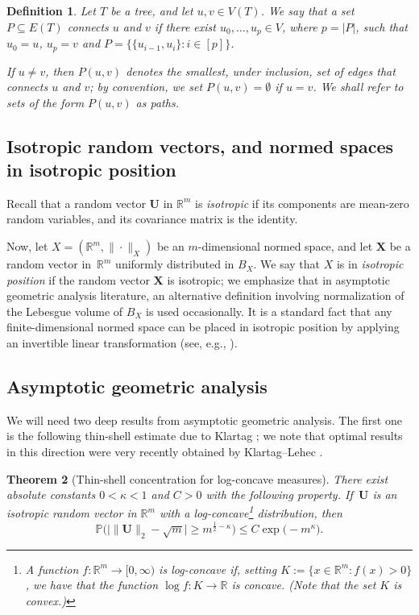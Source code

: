 \documentclass[11pt,leqno]{amsart}
\newtheorem{theorem}{Theorem}[section]
\newtheorem{definition}[theorem]{Definition}
\theoremstyle{remark}
\theoremstyle{plain}
\begin{document}
\begin{definition} \label{def2.1}
Let $T$ be a tree, and let $u,v\in V(T)$. We say that a set $P\subseteq E(T)$ \emph{connects $u$ and $v$} if there exist $u_0,\ldots,u_p\in V$, where $p=|P|$, such that $u_0=u$, $u_p=v$ and $P=\big\{\{u_{i-1},u_i\}\colon i\in[p]\big\}$.

If $u\neq v$, then $P(u,v)$ denotes the smallest, under inclusion, set of edges that connects $u$ and $v$; by convention, we set $P(u,v)=\emptyset$ if $u=v$. We shall refer to sets of the form $P(u,v)$ as \emph{paths}.
\end{definition}

\subsection{Isotropic random vectors, and normed spaces in isotropic position}

Recall that a random vector $\mathbf{U}$ in $\mathbb{R}^m$ is \textit{isotropic} if its components are mean-zero random variables, and its covariance matrix is the identity.

Now, let $X=(\mathbb{R}^m,\|\cdot\|_X)$ be an $m$-dimensional normed space, and let $\mathbf{X}$ be a random vector in~$\mathbb{R}^m$ uniformly distributed in $B_X$. We say that $X$ is in \textit{isotropic position} if the random vector $\mathbf{X}$ is isotropic;
we emphasize that in asymptotic geometric analysis literature, an alternative definition involving normalization of the Lebesgue volume of $B_X$ is used occasionally. It is a standard fact that any finite-dimensional normed space can be placed in isotropic position by applying an invertible linear transformation
(see, e.g., \cite{KL24a}).

\subsection{Asymptotic geometric analysis}

We will need two deep results from asymptotic geometric analysis. The first one is the following thin-shell estimate due to Klartag \cite{Kl07}; we note that optimal results in this direction were very recently obtained by Klartag--Lehec \cite{KL25}.

\begin{theorem}[Thin-shell concentration for log-concave measures] \label{thm:thinshell}
There exist absolute constants $0<\kappa <1$ and $C>0$ with the following property. If\, $\mathbf{U}$ is an isotropic random vector in $\mathbb{R}^m$ with a log-concave\footnote{A function $f\colon \mathbb{R}^m\to [0,\infty)$ is \emph{log-concave} if, setting $K:=\{x\in\mathbb{R}^m\colon f(x) > 0\}$, we have that the function $\log f\colon K\to\mathbb{R}$ is concave. (Note that the set $K$ is convex.)} distribution, then
\begin{equation} \label{eq2.2}
\mathbb{P}\Big(\big|\|\mathbf{U}\|_2 - \sqrt{m}\big|  \geqslant m^{\frac12 - \kappa} \Big) \leqslant C \exp\big(-m^{\kappa}\big).
\end{equation}
\end{theorem}
\end{document}

